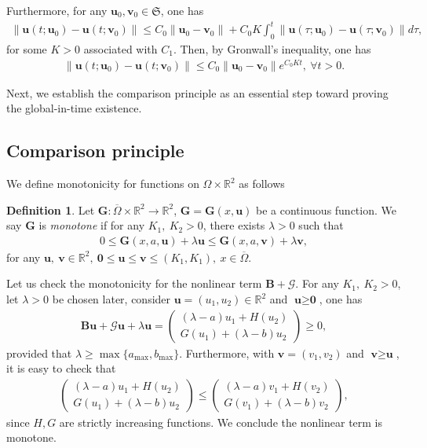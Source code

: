 \documentclass[a4paper,11pt]{amsart}
\theoremstyle{definition}
\newtheorem{definition}[theorem]{Definition}
\def\R{\mathbb{R}}
\def\O{\Omega}
\numberwithin{equation}{section}
\theoremstyle{definition}
\def\O{\Omega}
\begin{document}
Furthermore, for any $\textbf{u}_0,\textbf{v}_0\in \mathfrak{S}$, one has
\begin{align*}
\|\textbf{u}(t;\textbf{u}_0)-\textbf{u}(t;\textbf{v}_0)\|\leq C_0\|\textbf{u}_0-\textbf{v}_0\|+C_0K\int_0^t\|\textbf{u}(\tau;\textbf{u}_0)-\textbf{u}(\tau;\textbf{v}_0)\|d\tau,
\end{align*}
for some $K>0$ associated with $C_1$. Then, by Gronwall's inequality, one has
\begin{align}\label{continuous}
\|\textbf{u}(t;\textbf{u}_0)-\textbf{u}(t;\textbf{v}_0)\|\leq  C_0\|\textbf{u}_0-\textbf{v}_0\|e^{C_0Kt},~\forall t>0.
\end{align}

Next, we establish the comparison principle as an essential step toward proving the global-in-time existence.

\subsection{\bf Comparison principle}\label{section:comparison}

We define monotonicity for functions on $\O\times\mathbb{R}^2$ as follows


\begin{definition}\label{def:5}
Let $\textbf{G}:\overline{\O}\times\R^2\rightarrow \R^2$, $\textbf{G}=\textbf{G}(x,\textbf{u})$ be a continuous function. We say $\textbf{G}$ is \textit{monotone} if for any $K_1,~K_2>0$, there exists $\lambda>0$ such that 
\begin{align*}
0\leq \textbf{G}(x,a,\textbf{u})+\lambda \textbf{u}\leq \textbf{G}(x,a,\textbf{v})+\lambda \textbf{v},
\end{align*}
for any $ \textbf{u},~\textbf{v}\in \R^2,~ \textbf{0}\leq \textbf{u}\leq \textbf{v}\leq (K_1,K_1),~x\in \overline{\O}.$
\end{definition}

Let us check the monotonicity for the nonlinear term $\mathbf{B}+\mathcal{G}$. For any $K_1,~K_2>0$, let $\lambda>0$ be chosen later, consider $\textbf{u}=(u_1,u_2)\in \R^2$ and $\textbf{u}\geq \textbf{0}$, one has
\begin{align*}
\mathbf{B}\textbf{u}+\mathcal{G}\textbf{u}+\lambda \textbf{u}=\left(\begin{matrix}
(\lambda-a)u_1 + H(u_2)\\
G(u_1)+(\lambda-b)u_2
\end{matrix}\right)\geq 0,
\end{align*}
provided that $\lambda\geq \max\{a_{\max},b_{\max}\}$. Furthermore, with $\textbf{v}=(v_1,v_2)$ and $\textbf{v}\geq \textbf{u}$, it is easy to check that
\begin{align*}
\left(\begin{matrix}
(\lambda-a)u_1 + H(u_2)\\
G(u_1)+(\lambda-b)u_2
\end{matrix}\right)\leq 
\left(\begin{matrix}
(\lambda-a)v_1 + H(v_2)\\
G(v_1)+(\lambda-b)v_2
\end{matrix}\right),
\end{align*}
since $H,G$ are strictly increasing functions. We conclude the nonlinear term is monotone.
\end{document}
